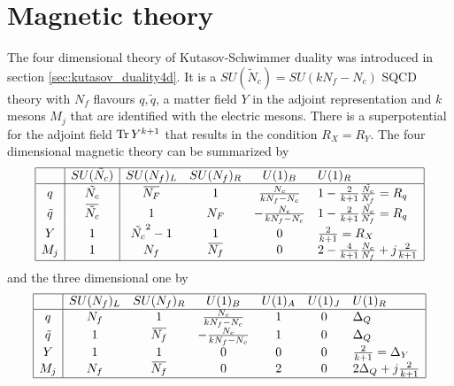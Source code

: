 \section{Magnetic theory}
The four dimensional theory of Kutasov-Schwimmer duality was introduced in section \ref{sec:kutasov_duality4d}. 
It is a $SU(\tilde{N}_c) = SU( k N_f - N_c)$ SQCD theory with $N_f$ flavours $q,\tilde{q} $, a matter field $Y$ in the adjoint representation and $k$ mesons $M_j$ that are identified with the electric mesons. There is a superpotential for the adjoint field $ \mathrm{Tr } \, Y^{k+1}$ that results in the condition $R_X = R_Y$.
The four dimensional magnetic theory can be summarized by
\begin{equation}
\begin{array}{|c |  c | c c c l |}
\hline
 & SU(\tilde{N_c})  & SU(N_f)_L  &SU(N_f)_R   & U(1)_B &  U(1)_R \\
\hline
q &  \tilde{N_c} & \overbar{N_F}  & 1   &   \frac{N_c}{k N_f - N_c }  &  1 - \frac{2}{k+1} \frac{ \tilde{N_c}}{N_f} = R_q   \\
\tilde{q} & \overbar{\tilde{N_c}}  & 1  &  N_F  & -\frac{N_c}{k N_f - N_c }   &   1 - \frac{2}{k+1} \frac{\tilde{N_c}}{N_f}  = R_q   \\
Y & 1  &  \tilde{N_c}^2-1  & 1    & 0   &   \frac{2}{k+1} = R_X  \\
 M_j & 1 & N_f &  \overbar{N_f} & 0 & 2 - \frac{4}{k+1} \frac{N_c}{N_f} + j \frac{2}{k+1} \\
 \hline
\end{array}
\end{equation}
%
and the three dimensional one by
%
\begin{equation}
\begin{array}{ | c | c c c c c l | } 
 \hline
	& SU(N_f)_L & SU(N_f)_R & U(1)_B & U(1)_A & U(1)_J  & U(1)_R   \\
 \hline
 q & N_f & 1 & \frac{N_c}{k N_f - N_c} & 1 & 0   & \Delta_Q  \\  
 \tilde{q} & 1 & \overbar{N_f}& - \frac{N_c}{k N_f - N_c}  & 1 & 0 & \Delta_Q      \\  
	Y & 1 & 1  & 0 & 0 & 0 & \frac{2}{k+1}= \Delta_Y    \\ 
	M_j & N_f & \overbar{N_f} & 0 & 2  &  0& 2 \Delta_Q + j \frac{2}{k+1} \\
 \hline
\end{array}
\label{tab:kim-park-magnetic-tab_reduction }
\end{equation}




